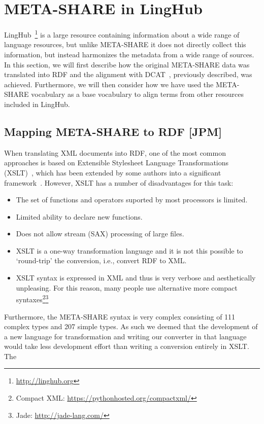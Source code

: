 \documentclass{llncs}
\begin{document}
{{\section{META-SHARE in LingHub}
\label{sec:linghub}
LingHub~\footnote{\url{http://linghub.org}} is a large resource containing information about a wide range of
language resources, but unlike META-SHARE it does not directly collect this
information, but instead harmonizes the metadata from a wide range of sources.
In this section, we will first describe how the original META-SHARE data was
translated into RDF and the alignment with DCAT~\cite{maali2014data}, previously
described, was achieved. Furthermore, we will then consider how we have used the
META-SHARE vocabulary as a base vocabulary to align terms from other resources
included in LingHub.
\subsection{Mapping META-SHARE to RDF [JPM]}
\label{sec:conversion}
When translating XML documents into RDF, one of the most common approaches is
based on Extensible Stylesheet Language Transformations
(XSLT)~\cite{wustner2002converting,van2008xml,borin2014representing}, which has
been extended by some authors into a significant
framework~\cite{lange2009krextor}. However, XSLT has a number of disadvantages
for this task:
\begin{itemize}
\item The set of functions and operators suported by most processors is
limited.
\item Limited ability to declare new functions.
\item Does not allow stream (SAX) processing of large files.
\item XSLT is a one-way transformation language and it is not this possible
to `round-trip' the conversion, i.e., convert RDF to XML.
\item XSLT syntax is expressed in XML and thus is very verbose and
aesthetically unpleasing. For this reason, many people use alternative
more compact syntaxes\footnote{Compact XML:
\url{https://pythonhosted.org/compactxml/}}\footnote{Jade:
\url{http://jade-lang.com/}}
\end{itemize}
Furthermore, the META-SHARE syntax is very complex consisting of 111 complex
types and 207 simple types. As such we deemed that the development of a new
language for transformation and writing our converter in that language would
take less development effort than writing a conversion entirely in XSLT. The
}}
\end{document}

